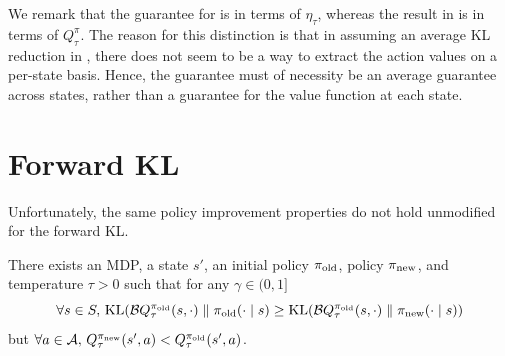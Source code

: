 \documentclass[\main/thesis.tex]{subfiles}
\begin{document}
We remark that the guarantee for  is in terms of $\eta_\tau$, whereas the result in  is in terms of $Q^\pi_\tau$. The reason for this distinction is that in assuming an average KL reduction in , there does not seem to be a way to extract the action values on a per-state basis. Hence, the guarantee must of necessity be an average guarantee across states, rather than a guarantee for the value function at each state. 



\section{Forward KL}
Unfortunately, the same policy improvement properties do not hold unmodified for the forward KL. 
\begin{proposition}\label{lem:forward-kl-counterexample}
There exists an MDP, a state $s'$, an initial policy ${\pi_\mathrm{old}}$, policy ${\pi_\mathrm{new}}$, and temperature $\tau > 0$ such that for any $\gamma \in (0, 1]$
\begin{equation*}
    \forall s \in S,\, \mathrm{KL}(\mathcal{B}Q_\tau^{\pi_\mathrm{old}}(s, \cdot) \parallel {\pi_\mathrm{old}}(\cdot \mid s) \geq \mathrm{KL}(\mathcal{B}Q_\tau^{\pi_\mathrm{old}}(s, \cdot) \parallel {\pi_\mathrm{new}}(\cdot \mid s))
    \end{equation*}
but $\forall a \in \mathcal{A}, \, Q_\tau^{\pi_\mathrm{new}}(s', a) < Q_\tau^{\pi_\mathrm{old}}(s', a)$.
\end{proposition}
\end{document}
